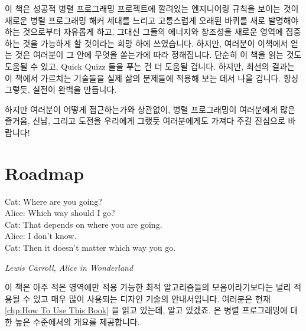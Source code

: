 이 책은 성공적 병렬 프로그래밍 프로젝트에 깔려있는 엔지니어링 규칙을 보이는
것이 새로운 병렬 프로그래밍 해커 세대를 느리고 고통스럽게 오래된 바퀴를 새로
발명해야 하는 것으로부터 자유롭게 하고, 그대신 그들의 에너지와 창조성을 새로운
영역에 집중하는 것을 가능하게 할 것이라는 희망 하에 쓰였습니다.
하지만, 여러분이 이책에서 얻는 것은 여러분이 그 안에 무엇을 쏟는가에 따라
정해집니다.
단순히 이 책을 읽는 것도 도움될 수 있고, Quick Quizz 들을 푸는 건 더 도움될
겁니다.
하지만, 최선의 결과는 이 책에서 가르치는 기술들을 실제 삶의 문제들에 적용해
보는 데서 나올 겁니다.
항상 그렇듯, 실전이 완벽을 만듭니다.

\iffalse

This book is written in the hope that presenting the engineering
discipline underlying successful
parallel-programming projects will free a new generation of parallel hackers
from the need to slowly and painstakingly reinvent old wheels, enabling
them to instead focus their energy and creativity on new frontiers.
However, what you get from this book will be determined by what you
put into it.
It is hoped that simply reading this book will be helpful,
and that working the Quick Quizzes will be even more helpful.
However, the best results come from applying the techniques taught
in this book to real-life problems.
As always, practice makes perfect.

\fi

하지만 여러분이 어떻게 접근하는가와 상관없이, 병렬 프로그래밍이 여러분에게 많은
즐거움, 신남, 그리고 도전을 우리에게 그랬듯 여러분에게도 가져다 주길 진심으로
바랍니다!

\iffalse

But no matter how you approach it, we sincerely hope that parallel
programming brings you at least as much fun, excitement, and challenge
that it has brought to us!

\fi

\section{Roadmap}
\label{sec:howto:Roadmap}
%
\epigraph{Cat: Where are you going? \\
	  Alice: Which way should I go? \\
	  Cat: That depends on where you are going. \\
	  Alice: I don't know. \\
	  Cat: Then it doesn't matter which way you go.}
	 {\emph{Lewis Carroll, Alice in Wonderland}}

이 책은 아주 적은 영역에만 적용 가능한 최적 알고리즘들의 모음이라기보다는 널리
적용될 수 있고 매우 많이 사용되는 디자인 기술의 안내서입니다.
여러분은 현재 \cref{chp:How To Use This Book} 을 읽고 있는데, 알고
있겠죠.
 은 병렬 프로그래밍에 대한 높은 수준에서의 개요를
제공합니다.

